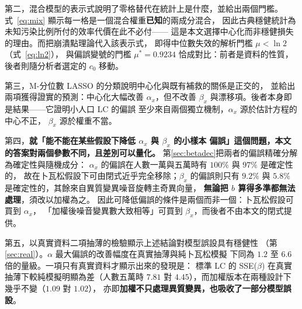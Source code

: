 \documentclass[UTF8, fontset=macnew, a4paper, 12pt]{ctexart}
\begin{document}
第二，混合模型的表示式說明了零格替代在統計上是什麼，並給出兩個門檻。
式~\eqref{eq:mix} 顯示每一格是一個混合權重\textbf{已知}的兩成分混合，
因此古典穩健統計為未知污染比例所付的效率代價在此不必付——
這是本文選擇中心化而非穩健損失的理由。而把崩潰點理論代入該表示式，
即得中位數失效的解析門檻 $\mu<\ln2$（式~\eqref{eq:ln2}），
與偏誤變號的門檻 $\mu^\ast=0.9234$ 恰成對比：前者是資料的性質，
後者則隨分析者選定的 $c_0$ 移動。

第三，M-分位數 LASSO 的分類說明中心化與既有補救的關係是正交的，
並給出兩項獲得證實的預測：中心化大幅改善 $\alpha_x$，但不改善
$\beta_x$ 與漂移項。後者本身即是結果——它證明小人口 LC 的偏誤
至少來自兩個獨立機制，$\alpha_x$ 源於估計方程的中心不正，
$\beta_x$ 源於權重不當。

第四，\textbf{就「能不能在某些假設下降低 $\alpha_x$ 與 $\beta_x$ 的小樣本
偏誤」這個問題，本文的答案對兩個參數不同，且差別可以量化。}
第\ref{sec:betadec}把兩者的偏誤精確分解為確定性與隨機成分：
$\alpha_x$ 的偏誤在人數一萬與五萬時有 $100\%$ 與 $97\%$ 是確定性的，
故在卜瓦松假設下可由閉式近乎完全移除；$\beta_x$ 的偏誤則只有
$9.2\%$ 與 $5.8\%$ 是確定性的，其餘來自異質變異噪音旋轉主奇異向量，
\textbf{無論把 $b$ 算得多準都無法處理}，須改以加權為之。
因此可降低偏誤的條件是兩個而非一個：卜瓦松假設可買到 $\alpha_x$，
「加權後噪音變異數大致相等」可買到 $\beta_x$，而後者不由本文的閉式提供。

第五，以真實資料二項抽薄的檢驗顯示上述結論對模型誤設具有穩健性
（第\ref{sec:real}）。$\alpha$ 最大偏誤的改善幅度在真實抽薄與純卜瓦松模擬
下同為 $1.2$ 至 $6.6$ 倍的量級。一項只有真實資料才顯示出來的發現是：
標準 LC 的 SSE($\beta$) 在真實抽薄下較純模擬明顯為差（人數五萬時 $7.81$
對 $4.45$），而加權版本在兩種設計下幾乎不變（$1.09$ 對 $1.02$），
亦即\textbf{加權不只處理異質變異，也吸收了一部分模型誤設}。
\end{document}
